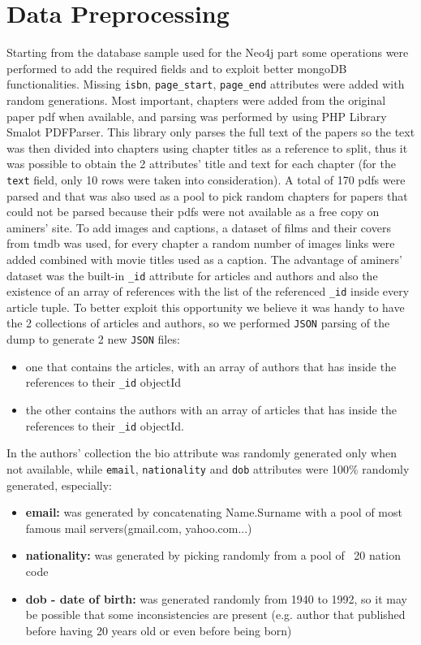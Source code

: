 \documentclass{Configuration_Files/PoliMi3i_thesis}
\begin{document}
\section{Data Preprocessing}
Starting from the database sample used for the Neo4j part some operations were performed to add the required fields and
to exploit better mongoDB functionalities. \newline
Missing \verb |isbn|, \verb |page_start|, \verb |page_end| attributes were added with random generations.\newline
Most important, chapters were added from the original paper pdf when available, and parsing was performed by using PHP
Library Smalot PDFParser. This library only parses the full text of the papers so the text was then divided into chapters
using chapter titles as a reference to split, thus it was possible to obtain the 2 attributes' title and text for each
chapter (for the \verb |text| field, only 10 rows were taken into consideration). A total of 170 pdfs were parsed and that
was also used as a pool to pick random chapters for papers that could not be parsed because their pdfs were not available
as a free copy on aminers' site.\newline
To add images and captions, a dataset of films and their covers from tmdb was used, for every chapter a random number of
images links were added combined with movie titles used as a caption.\newline
The advantage of aminers' dataset was the built-in \verb |_id| attribute for articles and authors and also the existence of an
array of references with the list of the referenced \verb |_id| inside every article tuple.\newline
To better exploit this opportunity we believe it was handy to have the 2 collections of articles and authors, so we
performed \verb |JSON| parsing of the dump to generate 2 new \verb |JSON| files:
\begin{itemize}
	\item one that contains the articles, with an array of authors that has inside the references to their \verb |_id| objectId
	\item the other contains the authors with an array of articles that has inside the references to their \verb |_id| objectId.
\end{itemize}
In the authors' collection the bio attribute was randomly generated only when not available, while \verb |email|, \verb |nationality| and
\verb |dob| attributes were 100\% randomly generated, especially:
\begin{itemize}
	\item \textbf{email:} was generated by concatenating Name.Surname with a pool of most famous mail servers(gmail.com, yahoo.com...)
	\item \textbf{nationality:} was generated by picking randomly from a pool of ~20 nation code
	\item \textbf{dob - date of birth:} was generated randomly from 1940 to 1992, so it may be possible that some inconsistencies are
		present (e.g. author that published before having 20 years old or even before being born)
\end{itemize}
\end{document}
